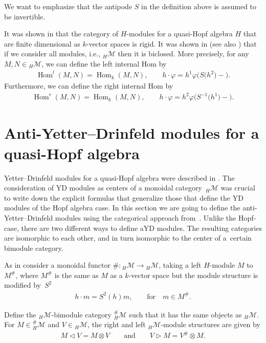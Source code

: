 \documentclass[10pt,a4paper]{amsart}
\newcommand{\hmod}{{_H\mathcal{M}}}
\newcommand{\hhash}{{^{\#}_H \mathcal{M}}}
\newcommand{\la}{\triangleright}
\newcommand{\ra}{\triangleleft}
\numberwithin{equation}{section}
\begin{document}
\begin{Remark}	We want to emphasize that the antipode $S$ in the definition above is assumed to be invertible.
\end{Remark}

It was shown in \cite{Drinfeld} that the category of $H$-modules for a quasi-Hopf algebra $H$ that are finite dimensional as $k$-vector spaces is rigid. It was shown in \cite{sk} (see also \cite{BPO_closed, majid_closed, SS_closed}) that if we consider all modules, i.e., $\hmod$ then it is biclosed. More precisely, for any $M, N\in \hmod$, we can define the left internal Hom by
\begin{gather*} %
 \operatorname{Hom}^l(M, N)=\operatorname{Hom}_k(M, N),\qquad h\cdot \varphi = h^1\varphi\big(S\big(h^2\big){-}\big).
\end{gather*} Furthermore, we can define the right internal Hom by
\begin{gather} \label{righthom}
 \operatorname{Hom}^r(M, N)=\operatorname{Hom}_k(M, N),\qquad h\cdot \varphi = h^2\varphi\big(S^{-1}\big(h^1\big){-}\big).
\end{gather}

\section{Anti-Yetter--Drinfeld modules for a quasi-Hopf algebra}\label{s:qHopf-ayd}

Yetter--Drinfeld modules for a quasi-Hopf algebra were described in \cite{majid}. The consideration of YD modules as centers of a monoidal category~$\hmod$ was crucial to write down the explicit formulas that generalize those that define the YD modules of the Hopf algebra case. In this section we are going to define the anti-Yetter--Drinfeld modules using the categorical approach from~\cite{hks}. Unlike the Hopf-case, there are two different ways to define aYD modules. The resulting categories are isomorphic to each other, and in turn isomorphic to the center of a~certain bimodule category.

As in \cite{hks} consider a monoidal functor $\#\colon \hmod \rightarrow \hmod $, taking a left $H$-module $M$ to $M^{\#}$, where $M^\#$ is the same as $M$ as a $k$-vector space but the module structure is modified by~$S^2$
 \begin{gather*}
 h \cdot m = S^2(h)m, \qquad \text{for} \quad m \in M^\#.
 \end{gather*}

 Define the $\hmod$-bimodule category $\hhash$ such that it has the same objects as $\hmod$. For $M\in\hhash$ and $V\in\hmod$, the right and left $\hmod$-module structures are given by
 \begin{gather*}
 M \ra V= M\otimes V \qquad \text{and} \qquad V \la M= V^\# \otimes M .
 \end{gather*}
\end{document}

